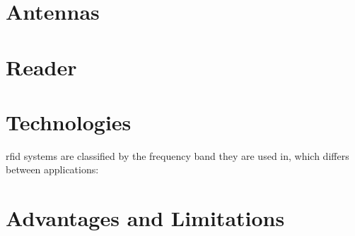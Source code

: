 



\section{Antennas} \label{sec:antenna}


\section{Reader} \label{sec:reader}

\section{Technologies}

\ac{rfid} systems are classified by the frequency band they are used in, which differs between applications:

\section{Advantages and Limitations}






